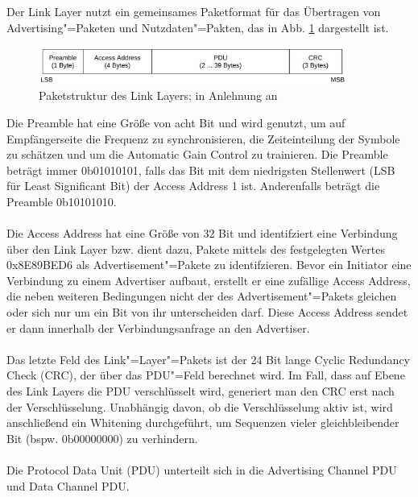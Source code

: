 Der Link Layer nutzt ein gemeinsames Paketformat für das Übertragen von Advertising"=Paketen und Nutzdaten"=Pakten, das in Abb. \ref{fig: ll paket struktur} dargestellt ist.\\
\begin{figure}[H]
    \centering
    \includegraphics[width=0.9\textwidth]{graphics/link_layer_packetformat.pdf}
    \caption[Paketstruktur des Link Layers]{Paketstruktur des Link Layers; in Anlehnung an \cite{BtSpec4.0_fig_2200}}
    \label{fig: ll paket struktur}
\end{figure}
Die Preamble hat eine Größe von acht Bit und wird genutzt, um auf Empfängerseite die Frequenz zu synchronisieren, die Zeiteinteilung der Symbole zu schätzen und um die Automatic Gain Control zu trainieren. Die Preamble beträgt immer 0b01010101, falls das Bit mit dem niedrigsten Stellenwert (LSB für Least Significant Bit) der Access Address 1 ist. Anderenfalls beträgt die Preamble 0b10101010. \cite{BtSpec4.0_2200-2201}
\\\\
Die Access Address hat eine Größe von 32 Bit und identifziert eine Verbindung über den Link Layer bzw. dient dazu, Pakete mittels des festgelegten Wertes 0x8E89BED6 als Advertisement"=Pakete zu identifzieren. Bevor ein Initiator eine Verbindung zu einem Advertiser aufbaut, erstellt er eine zufällige Access Address, die neben weiteren Bedingungen nicht der des Advertisement"=Pakets gleichen oder sich nur um ein Bit von ihr unterscheiden darf. Diese Access Address sendet er dann innerhalb der Verbindungsanfrage an den Advertiser. \cite{BtSpec4.0_2200-2201}
\\\\
Das letzte Feld des Link"=Layer"=Pakets ist der 24 Bit lange Cyclic Redundancy Check (CRC), der über das PDU"=Feld berechnet wird. Im Fall, dass auf Ebene des Link Layers die PDU verschlüsselt wird, generiert man den CRC erst nach der Verschlüsselung. Unabhängig davon, ob die Verschlüsselung aktiv ist, wird anschließend ein Whitening \cite{BtSpec4.0_2217-2218} durchgeführt, um Sequenzen vieler gleichbleibender Bit (bspw. 0b00000000) zu verhindern. \cite{BtSpec4.0_2200-2201}
\\\\
Die Protocol Data Unit (PDU) unterteilt sich in die Advertising Channel PDU und Data Channel PDU.


